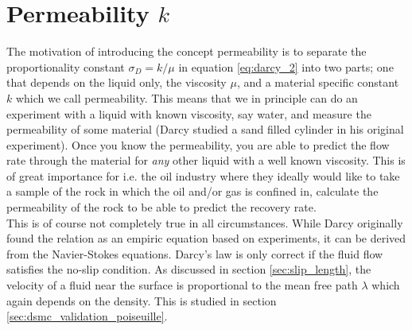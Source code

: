 \section{Permeability $k$}
\label{sec:permeability}
The motivation of introducing the concept permeability is to separate the proportionality constant $\sigma_D = k/\mu$ in equation \eqref{eq:darcy_2} into two parts; one that depends on the liquid only, the viscosity $\mu$, and a material specific constant $k$ which we call permeability. This means that we in principle can do an experiment with a liquid with known viscosity, say water, and measure the permeability of some material (Darcy studied a sand filled cylinder in his original experiment). Once you know the permeability, you are able to predict the flow rate through the material for \textit{any} other liquid with a well known viscosity. This is of great importance for i.e. the oil industry where they ideally would like to take a sample of the rock in which the oil and/or gas is confined in, calculate the permeability of the rock to be able to predict the recovery rate.\\
This is of course not completely true in all circumstances. While Darcy originally found the relation as an empiric equation based on experiments, it can be derived from the Navier-Stokes equations. Darcy's law is only correct if the fluid flow satisfies the no-slip condition. As discussed in section \ref{sec:slip_length}, the velocity of a fluid near the surface is proportional to the mean free path $\lambda$ which again depends on the density. This is studied in section \ref{sec:dsmc_validation_poiseuille}.  
